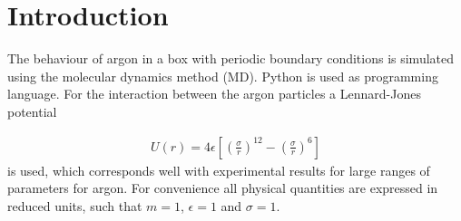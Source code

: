 \section{Introduction}
The behaviour of argon in a box with periodic boundary conditions is simulated using the molecular dynamics method (MD). Python is used as programming language. For the interaction between the argon particles a Lennard-Jones potential

\begin{gather*}
U(r) = 4\epsilon \left[\left(\frac{\sigma}{r}\right)^{12}-\left(\frac{\sigma}{r}\right)^6\right]
\end{gather*}
is used, which corresponds well with experimental results for large ranges of parameters for argon\cite{hoover1970comparison}. For convenience all physical quantities are expressed in reduced units, such that $m=1$, $\epsilon = 1$ and $\sigma = 1$.